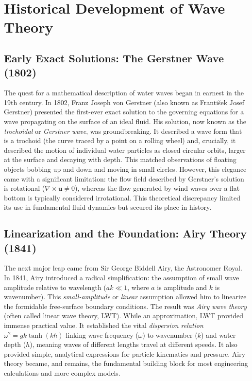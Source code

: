 \documentclass[11pt,letterpaper]{article}
\begin{document}
    \section{Historical Development of Wave Theory}
    \subsection{Early Exact Solutions: The Gerstner Wave (1802)}
    The quest for a mathematical description of water waves began in earnest in the 19th century. In 1802, Franz Joseph von Gerstner (also known as František Josef Gerstner) presented the first-ever exact solution to the governing equations for a wave propagating on the surface of an ideal fluid. His solution, now known as the \emph{trochoidal} or \emph{Gerstner wave}, was groundbreaking. It described a wave form that is a trochoid (the curve traced by a point on a rolling wheel) and, crucially, it described the motion of individual water particles as closed circular orbits, larger at the surface and decaying with depth. This matched observations of floating objects bobbing up and down and moving in small circles. However, this elegance came with a significant limitation: the flow field described by Gerstner's solution is rotational ($\nabla \times \mathbf{u} \neq 0$), whereas the flow generated by wind waves over a flat bottom is typically considered irrotational. This theoretical discrepancy limited its use in fundamental fluid dynamics but secured its place in history.

    \subsection{Linearization and the Foundation: Airy Theory (1841)}
    The next major leap came from Sir George Biddell Airy, the Astronomer Royal. In 1841, Airy introduced a radical simplification: the assumption of small wave amplitude relative to wavelength ($ak \ll 1$, where $a$ is amplitude and $k$ is wavenumber). This \emph{small-amplitude} or \emph{linear} assumption allowed him to linearize the formidable free-surface boundary conditions. The result was \emph{Airy wave theory} (often called linear wave theory, LWT). While an approximation, LWT provided immense practical value. It established the vital \emph{dispersion relation} $\omega^2 = gk \tanh(kh)$ linking wave frequency ($\omega$) to wavenumber ($k$) and water depth ($h$), meaning waves of different lengths travel at different speeds. It also provided simple, analytical expressions for particle kinematics and pressure. Airy theory became, and remains, the fundamental building block for most engineering calculations and more complex models.
\end{document}
